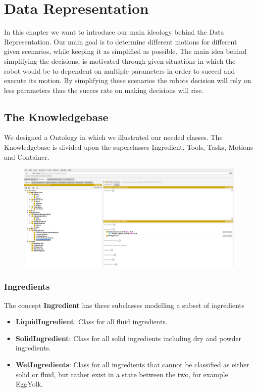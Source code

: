\chapter{Data Representation}
\label{chap:Data_representation}

In this chapter we want to introduce our main ideology behind the Data Representation. Our main goal is to determine different motions for different given scenarios, while keeping it as simplified as possible.
The main idea behind simplifying the decisions, is motivated through given situations in which the robot would be to dependent on multiple parameters in order to suceed and execute its motion.
By simplifying these scenarios the robots decision will rely on less parameters thus the succes rate on making decisions will rise.

\section{The Knowledgebase}
We designed a Ontology in which we illustrated our needed classes. 
The Knowledgebase is divided upon the superclasses Ingredient, Tools, Tasks, Motions and Container.
\begin{figure}[H]
\includegraphics[scale=0.3]{Graphics/Ontology.png}
\end{figure}

\subsection{Ingredients}
The concept \textbf{Ingredient} has three subclasses modelling a subset of ingredients
\begin{itemize}
    \item \textbf{LiquidIngredient}: Class for all fluid ingredients.
    \item \textbf{SolidIngredient}: Class for all solid ingredients including dry and powder ingredients. 
    \item \textbf{WetIngredients}: Class for all ingredients that cannot be classified as either solid or fluid, but rather exist in a state between the two, for example
        EggYolk.
\end{itemize}

